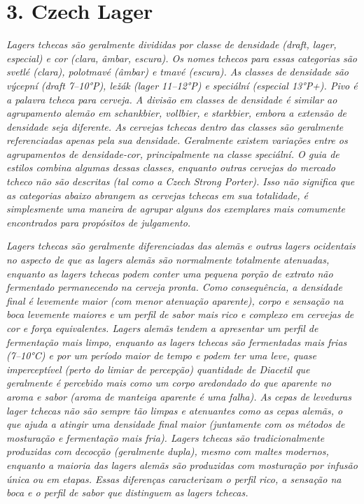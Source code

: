 \section*{3. Czech Lager}
\textit{Lagers tchecas são geralmente divididas por classe de densidade (draft, lager, especial) e cor (clara, âmbar, escura). Os nomes tchecos para essas categorias são svetlé (clara), polotmavé (âmbar) e tmavé (escura). As classes de densidade são výcepní (draft 7–10°P), ležák (lager 11–12°P) e speciální (especial 13°P+). Pivo é a palavra tcheca para cerveja. A divisão em classes de densidade é similar ao agrupamento alemão em schankbier, vollbier, e starkbier, embora a extensão de densidade seja diferente. As cervejas tchecas dentro das classes são geralmente referenciadas apenas pela sua densidade. Geralmente existem variações entre os agrupamentos de densidade-cor, principalmente na classe speciální. O guia de estilos combina algumas dessas classes, enquanto outras cervejas do mercado tcheco não são descritas (tal como a Czech Strong Porter). Isso não significa que as categorias abaixo abrangem as cervejas tchecas em sua totalidade, é simplesmente uma maneira de agrupar alguns dos exemplares mais comumente encontrados para propósitos de julgamento.}

\textit{Lagers tchecas são geralmente diferenciadas das alemãs e outras lagers ocidentais no aspecto de que as lagers alemãs são normalmente totalmente atenuadas, enquanto as lagers tchecas podem conter uma pequena porção de extrato não fermentado permanecendo na cerveja pronta. Como consequência, a densidade final é levemente maior (com menor atenuação aparente), corpo e sensação na boca levemente maiores e um perfil de sabor mais rico e complexo em cervejas de cor e força equivalentes. Lagers alemãs tendem a apresentar um perfil de fermentação mais limpo, enquanto as lagers tchecas são fermentadas mais frias (7–10°C) e por um período maior de tempo e podem ter uma leve, quase imperceptível (perto do limiar de percepção) quantidade de Diacetil que geralmente é percebido mais como um corpo aredondado do que aparente no aroma e sabor (aroma de manteiga aparente é uma falha). As cepas de leveduras lager tchecas não são sempre tão limpas e atenuantes como as cepas alemãs, o que ajuda a atingir uma densidade final maior (juntamente com os métodos de mosturação e fermentação mais fria). Lagers tchecas são tradicionalmente produzidas com decocção (geralmente dupla), mesmo com maltes modernos, enquanto a maioria das lagers alemãs são produzidas com mosturação por infusão única ou em etapas. Essas diferenças caracterizam o perfil rico, a sensação na boca e o perfil de sabor que distinguem as lagers tchecas.}